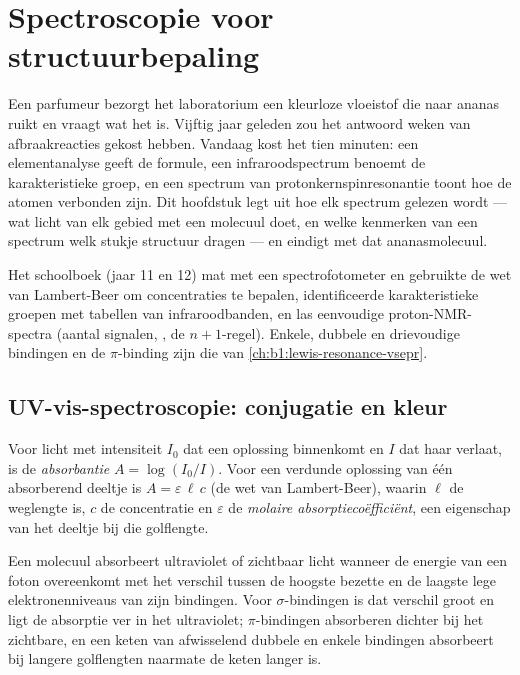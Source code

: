 \chapter{Spectroscopie voor structuurbepaling}\label{ch:b1:structure-spectroscopy}

Een parfumeur bezorgt het laboratorium een kleurloze vloeistof die naar
ananas ruikt en vraagt wat het is. Vijftig jaar geleden zou het antwoord
weken van afbraakreacties gekost hebben. Vandaag kost het tien minuten:
een elementanalyse geeft de formule, een infraroodspectrum benoemt de
karakteristieke groep, en een spectrum van protonkernspinresonantie toont
hoe de atomen verbonden zijn. Dit hoofdstuk legt uit hoe elk spectrum
gelezen wordt --- wat licht van elk gebied met een molecuul doet, en
welke kenmerken van een spectrum welk stukje structuur dragen --- en
eindigt met dat ananasmolecuul.

\begin{recall}
Het schoolboek (jaar 11 en 12) mat  met een spectrofotometer
en gebruikte de wet van Lambert-Beer om concentraties te bepalen,
identificeerde karakteristieke groepen met tabellen van infraroodbanden,
en las eenvoudige proton-NMR-spectra (aantal signalen, , de
$n + 1$-regel). Enkele, dubbele en drievoudige bindingen en de
$\pi$-binding zijn die van \cref{ch:b1:lewis-resonance-vsepr}.
\end{recall}

\section{UV-vis-spectroscopie: conjugatie en kleur}

\begin{definition}\label{def:b1:structure-spectroscopy:absorbance}
Voor licht met intensiteit $I_0$ dat een oplossing binnenkomt en $I$ dat
haar verlaat, is de \emph{absorbantie}
$A = \log(I_0/I)$. Voor een verdunde oplossing van één absorberend
deeltje is $A = \varepsilon\,\ell\,c$ (de wet van Lambert-Beer), waarin
$\ell$ de weglengte is, $c$ de concentratie en $\varepsilon$ de
\emph{molaire
absorptiecoëfficiënt},
een eigenschap van het deeltje bij die golflengte.
\end{definition}

Een molecuul absorbeert ultraviolet of zichtbaar licht wanneer de
energie van een foton over\-een\-komt met het verschil tussen de hoogste
bezette en de laagste lege elektronenniveaus van zijn bindingen. Voor
$\sigma$-bindingen is dat verschil groot en ligt de absorptie ver in het
ultraviolet; $\pi$-bindingen absorberen dichter bij het zichtbare, en een
keten van afwisselend dubbele en enkele bindingen absorbeert bij
langere golflengten naarmate de keten langer is.

